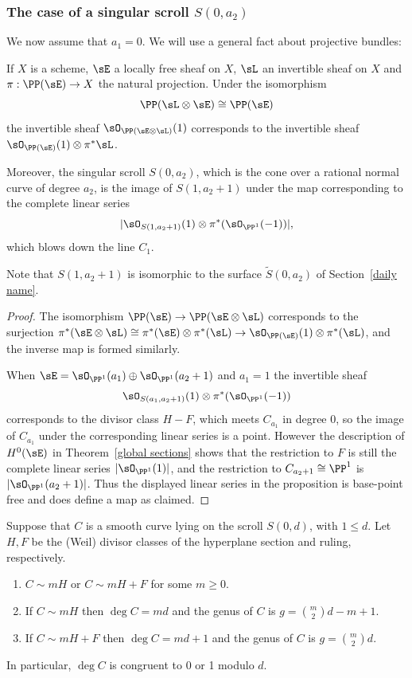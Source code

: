 \subsubsection{The case of a singular scroll $S(0,a_{2})$}


We now assume that $a_{1} = 0$. We will use a general fact about projective bundles:

\begin{proposition}\label{singular scrolls}
If $X$ is a scheme, $\sE$ a locally free sheaf on $X$, $\sL$ an invertible sheaf on $X$ 
and $\pi: \PP(\sE)\to X$ the natural projection.
Under the isomorphism 
$$
\PP(\sL \otimes \sE)\cong \PP(\sE)
$$
the invertible sheaf $\sO_{\PP(\sE\otimes \sL)}(1)$ corresponds to the invertible sheaf
$\sO_{\PP(\sE)}(1)\otimes \pi^{*}\sL$. 

Moreover, the singular scroll $S(0,a_{2})$, which is the cone over a rational normal curve of degree $a_{2}$, is the image of
$S(1, a_{2}+1)$ under the map corresponding to the complete linear series 
$$
|\sO_{S(1, a_{2}+1)}(1) \otimes \pi^{*}(\sO_{\PP^{1}}(-1))|,
$$
which blows down the line $C_{1}$.
\end{proposition}

Note that $S(1,a_2+1)$ is isomorphic to the surface $\tilde S(0, a_2)$ of Section~\ref{daily name}.

\begin{proof} 
The isomorphism $\PP(\sE) \to \PP(\sE\otimes \sL)$ corresponds to the surjection 
$\pi^*(\sE \otimes\sL) \cong \pi^*(\sE) \otimes \pi^*(\sL) \to \sO_{\PP(\sE)}(1) \otimes \pi^*(\sL)$, 
and the inverse map is formed similarly.

When $\sE = \sO_{\PP^1}(a_1)\oplus \sO_{\PP^1}(a_2+1)$ and $a_1 = 1$ the
invertible sheaf
$$
\sO_{S(a_1, a_{2}+1)}(1) \otimes \pi^{*}(\sO_{\PP^{1}}(-1))
$$
 corresponds to the divisor class $H-F$, which meets $C_{a_1}$  in degree 0, so the image
of $C_{a_1}$ under the corresponding linear series is a point. However the description of  $H^0(\sE)$ in
Theorem~\ref{global sections} shows that the restriction to $F$
is still the complete linear series $|\sO_{\PP^1}(1)|$, and the restriction to $C_{{a_2}+1}\cong \PP^1$
is $|\sO_{\PP^1}(a_2+1)|$. Thus the displayed linear series in the proposition is base-point free and
does define a map as claimed.
\end{proof}

\begin{theorem}\label{curves on a singular scroll}
 Suppose that $C$ is a smooth curve lying on the scroll $S(0,d)$, with $1\leq d$. Let $H,F$ be the (Weil) divisor classes of the hyperplane section and ruling, respectively.
\begin{enumerate}
\item $C\sim mH$ or $C\sim mH+F$ for some $m\geq 0$.
\item If $C\sim mH$ then $\deg C = md$ and the genus of $C$ is $g = \binom{m}{2}d-m+1$.
\item If $C\sim mH+F$ then $\deg C = md+1$ and the genus of $C$ is $g = \binom{m}{2}d$.
\end{enumerate}
In particular, $\deg C$ is congruent to 0 or 1 modulo $d$.
\end{theorem}

